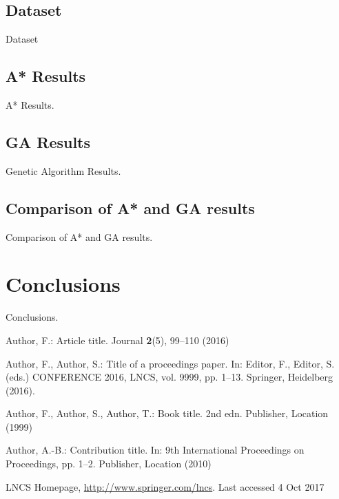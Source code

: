 \documentclass[11pt]{llncs}
\begin{document}
\subsection{Dataset}\label{dataset}
Dataset
\subsection{A* Results}\label{astar_results}
A* Results.
\subsection{GA Results}\label{gen_results}
Genetic Algorithm Results.
\subsection{Comparison of A* and GA results}\label{comparison_astar_gen}
Comparison of A* and GA results.
\section{Conclusions}\label{conclusions}
Conclusions.
\begin{thebibliography}{8}
Author, F.: Article title. Journal \textbf{2}(5), 99--110 (2016)

Author, F., Author, S.: Title of a proceedings paper. In: Editor,
F., Editor, S. (eds.) CONFERENCE 2016, LNCS, vol. 9999, pp. 1--13.
Springer, Heidelberg (2016). 

Author, F., Author, S., Author, T.: Book title. 2nd edn. Publisher,
Location (1999)

Author, A.-B.: Contribution title. In: 9th International Proceedings
on Proceedings, pp. 1--2. Publisher, Location (2010)

LNCS Homepage, \url{http://www.springer.com/lncs}. Last accessed 4
Oct 2017
\end{thebibliography}
\end{document}
